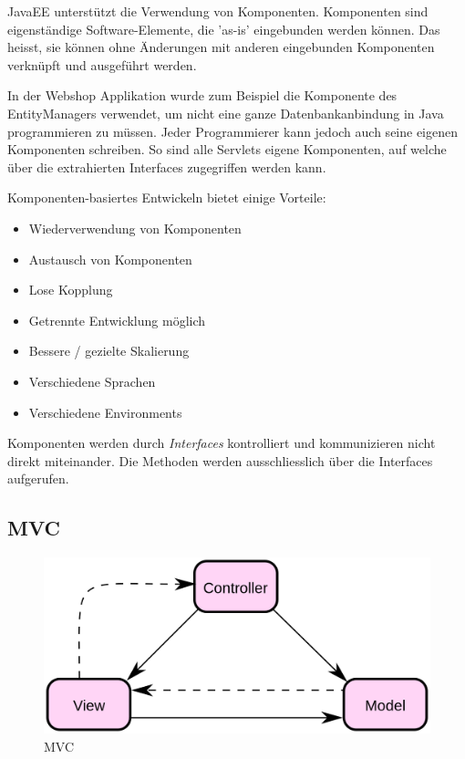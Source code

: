\documentclass[a4paper, 11pt]{article}
\begin{document}
\vspace{10px}

JavaEE unterstützt die Verwendung von Komponenten. Komponenten sind eigenständige Software-Elemente, die 'as-is' eingebunden werden können. Das heisst, sie können ohne Änderungen mit anderen eingebunden Komponenten verknüpft und ausgeführt werden.

In der Webshop Applikation wurde zum Beispiel die Komponente des EntityManagers verwendet, um nicht eine ganze Datenbankanbindung in Java programmieren zu müssen. Jeder Programmierer kann jedoch auch seine eigenen Komponenten schreiben. So sind alle Servlets eigene Komponenten, auf welche über die extrahierten Interfaces zugegriffen werden kann.

\vspace{10px}

Komponenten-basiertes Entwickeln bietet einige Vorteile:

\begin{itemize}
	\item  Wiederverwendung von Komponenten
	\item  Austausch von Komponenten
	\item  Lose Kopplung
	\item  Getrennte Entwicklung möglich
	\item  Bessere / gezielte Skalierung
	\item  Verschiedene Sprachen
	\item  Verschiedene Environments
\end{itemize}

\vspace{10px}



Komponenten werden durch \textit{Interfaces} kontrolliert und kommunizieren nicht direkt miteinander. Die Methoden werden ausschliesslich über die Interfaces aufgerufen.

\subsection{MVC}

\begin{figure}
	\centering
	\includegraphics[keepaspectratio=true,height=7.5\baselineskip]{mvc.png}
	\caption{MVC}
	\label{fig:mvc}
\end{figure}
\end{document}
